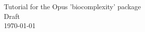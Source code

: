 \documentclass[fleqn]{howto}
\begin{document}
\begin{center}
{\Large Tutorial for the Opus 'biocomplexity' package}\\[5mm]
{\large Draft}\\[2mm]
\today
\end{center}
\end{document}
